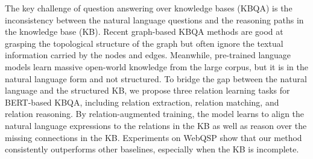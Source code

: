 The key challenge of question answering over knowledge bases (KBQA) is the inconsistency between the natural language questions and the reasoning paths in the knowledge base (KB). Recent graph-based KBQA methods are good at grasping the topological structure of the graph but often ignore the textual information carried by the nodes and edges. Meanwhile, pre-trained language models learn massive open-world knowledge from the large corpus, but it is in the natural language form and not structured. To bridge the gap between the natural language and the structured KB, we propose three relation learning tasks for BERT-based KBQA, including relation extraction, relation matching, and relation reasoning. By relation-augmented training, the model learns to align the natural language expressions to the relations in the KB as well as reason over the missing connections in the KB. Experiments on WebQSP show that our method consistently outperforms other baselines, especially when the KB is incomplete.
